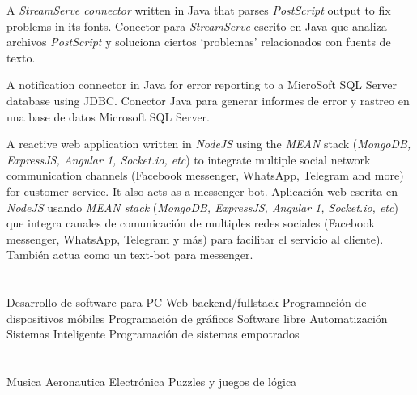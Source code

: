 \documentclass[11pt,a4paper,sans]{moderncv}
\begin{document}

    {\ml
    {A \textit{StreamServe connector} written in Java that parses
    \textit{PostScript} output to fix problems in its fonts.}
    {Conector para \textit{StreamServe} escrito en Java que analiza archivos
    \textit{PostScript} y soluciona ciertos `problemas' relacionados con fuents
    de texto.}
}


    {\ml
    {A notification connector in Java for error reporting to a MicroSoft SQL
    Server database using JDBC.}
    {Conector Java para generar informes de error y rastreo en una base de
    datos Microsoft SQL Server.}
}


    {\ml
    {A reactive web application written in \textit{NodeJS} using the
    \textit{MEAN} stack (\textit{MongoDB, ExpressJS, Angular 1, Socket.io,
    etc}) to integrate multiple social network communication channels (Facebook
    messenger, WhatsApp, Telegram and more) for customer service. It also acts
    as a messenger bot.}
    {Aplicación web escrita en \textit{NodeJS} usando \textit{MEAN stack}
    (\textit{MongoDB, ExpressJS, Angular 1, Socket.io, etc}) que integra
    canales de comunicación de multiples redes sociales (Facebook messenger,
    WhatsApp, Telegram y más) para facilitar el servicio al cliente). También
    actua como un text-bot para messenger.}
}


\section{}

\cvlistdoubleitem
    {          {Desarrollo de software para PC}}
    {    {Web backend/fullstack}}
\cvlistdoubleitem
    {       {Programación de dispositivos móbiles}}
    {             {Programación de gráficos}}
\cvlistdoubleitem
    {                      {Software libre}}
    {                       {Automatización}}
\cvlistdoubleitem
    { {Sistemas Inteligente}}
    {     {Programación de sistemas empotrados}}


\section{}

\cvlistdoubleitem
    {                      {Musica}}
    {                {Aeronautica}}
\cvlistdoubleitem
    {                {Electrónica}}
    {         {Puzzles y juegos de lógica}}

\renewcommand{\listitemsymbol}{-~}            %
\end{document}
